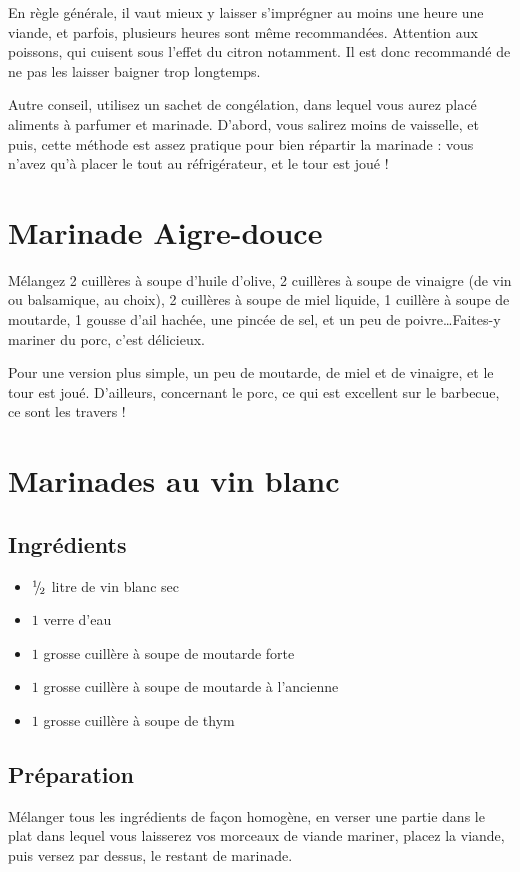 
\newpage
En règle générale, il vaut mieux y laisser s'imprégner au moins une heure une viande, et parfois, plusieurs heures sont même recommandées. Attention aux poissons, qui \og cuisent \fg sous l'effet du citron notamment. Il est donc recommandé de ne pas les laisser baigner trop longtemps.

Autre conseil, utilisez un sachet de congélation, dans lequel vous aurez placé aliments à parfumer et marinade. D'abord, vous salirez moins de vaisselle, et puis, cette méthode est assez pratique pour bien répartir la marinade : vous n'avez qu'à placer le tout au réfrigérateur, et le tour est joué !

\section{Marinade Aigre-douce}
Mélangez 2 cuillères à soupe d'huile d'olive, 2 cuillères à soupe de vinaigre (de vin ou balsamique, au choix), 2 cuillères à soupe de miel liquide, 1 cuillère à soupe de moutarde, 1 gousse d'ail hachée, une pincée de sel, et un peu de poivre\dots  Faites-y mariner du porc, c'est délicieux.

Pour une version plus simple, un peu de moutarde, de miel et de vinaigre, et le tour est joué. D'ailleurs, concernant le porc, ce qui est excellent sur le barbecue, ce sont les travers !

\section{Marinades au vin blanc}
\subsection*{Ingrédients}

\begin{itemize}
\item ${{}^{1\!\!}/ _{\!2}}$ litre de vin blanc sec
\item $1$ verre d'eau
\item $1$ grosse cuillère à soupe de moutarde forte
\item $1$ grosse cuillère à soupe de moutarde à l'ancienne
\item $1$ grosse cuillère à soupe de thym
\end{itemize}

\subsection*{Préparation}
Mélanger tous les ingrédients de façon homogène, en verser une partie dans le plat dans lequel vous laisserez vos morceaux de viande mariner, placez la viande, puis versez par dessus, le restant de marinade.

